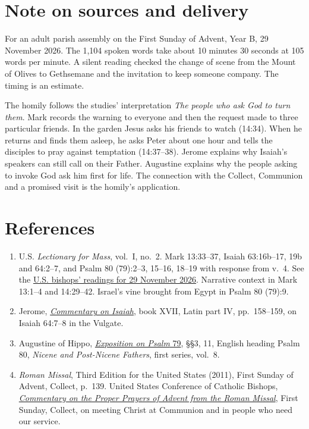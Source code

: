 \section{Note on sources and delivery}

For an adult parish assembly on the First Sunday of Advent, Year B, 29 November 2026. The 1,104 spoken words take about 10 minutes 30 seconds at 105 words per minute. A silent reading checked the change of scene from the Mount of Olives to Gethsemane and the invitation to keep someone company. The timing is an estimate.

The homily follows the studies' interpretation \textit{The people who ask God to turn them}. Mark records the warning to everyone and then the request made to three particular friends. In the garden Jesus asks his friends to watch (14:34). When he returns and finds them asleep, he asks Peter about one hour and tells the disciples to pray against temptation (14:37--38). Jerome explains why Isaiah's speakers can still call on their Father. Augustine explains why the people asking to invoke God ask him first for life. The connection with the Collect, Communion and a promised visit is the homily's application.

\section{References}
\begin{enumerate}
\item U.S. \textit{Lectionary for Mass}, vol.~I, no.~2. Mark 13:33--37, Isaiah 63:16b--17, 19b and 64:2--7, and Psalm 80 (79):2--3, 15--16, 18--19 with response from v.~4. See the \href{https://bible.usccb.org/bible/readings/112926.cfm}{U.S. bishops' readings for 29 November 2026}. Narrative context in Mark 13:1--4 and 14:29--42. Israel's vine brought from Egypt in Psalm 80 (79):9.
\item Jerome, \href{https://web.archive.org/web/20240709131605id_/https://documentacatholicaomnia.eu/03d/0347-0420,_Hieronymus,_In_Isaiam_Pars_4,_LT.pdf\#page=158}{\textit{Commentary on Isaiah}}, book XVII, Latin part IV, pp.~158--159, on Isaiah 64:7--8 in the Vulgate.
\item Augustine of Hippo, \href{https://www.newadvent.org/fathers/1801080.htm}{\textit{Exposition on Psalm} 79}, §§3, 11, English heading Psalm 80, \textit{Nicene and Post-Nicene Fathers}, first series, vol.~8.
\item \textit{Roman Missal}, Third Edition for the United States (2011), First Sunday of Advent, Collect, p.~139. United States Conference of Catholic Bishops, \href{https://www.usccb.org/prayer-and-worship/liturgical-year-and-calendar/advent/commentary-on-advent-proper-prayers}{\textit{Commentary on the Proper Prayers of Advent from the Roman Missal}}, First Sunday, Collect, on meeting Christ at Communion and in people who need our service.
\end{enumerate}
